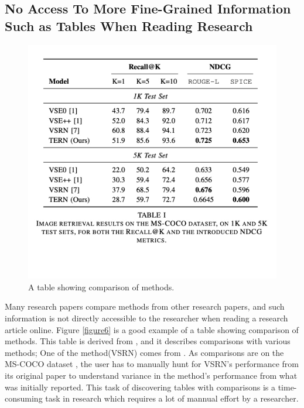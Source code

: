 \subsection{No Access To More Fine-Grained Information Such as Tables When Reading Research}
\begin{figure}[h]
    \centering
    \includegraphics[width=\maxwidth{\textwidth}]{src/images/table-example.pdf}
    \caption{A table showing comparison of methods.}
    \label{figure\arabic{figurecounter}}
\end{figure}
Many research papers compare methods from other research papers, and such information is not directly accessible to the researcher when reading a research article online. Figure \ref{figure6} is a good example of a table showing comparison of methods. This table is derived from \cite{messina2020transformer}, and it describes comparisons with various methods; One of the method(VSRN) comes from \cite{li2019visual}. As comparisons are on the MS-COCO dataset \parencite{lin2014microsoft}, the user has to manually hunt for VSRN's performance from its original paper to understand variance in the method's performance from what was initially reported. This task of discovering tables with comparisons is a time-consuming task in research which requires a lot of mannual effort by a researcher.  

